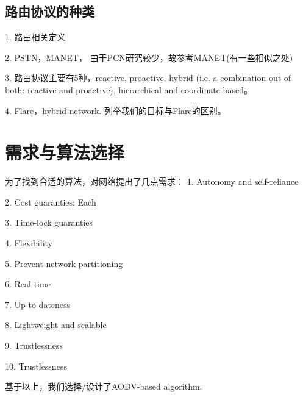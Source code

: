 \documentclass[12pt,a4paper]{article}
\begin{document}
\subsection{路由协议的种类}


1. 路由相关定义

2. PSTN，MANET，
由于PCN研究较少，故参考MANET(有一些相似之处)

3. 路由协议主要有5种，reactive, proactive, hybrid (i.e. a combination out of both: reactive and proactive), hierarchical and coordinate-based。

4. Flare，hybrid network. 列举我们的目标与Flare的区别。

\section{需求与算法选择}
为了找到合适的算法，对网络提出了几点需求：
1. Autonomy and self-reliance

2. Cost guaranties: Each

3. Time-lock guaranties

4. Flexibility

5. Prevent network partitioning

6. Real-time

7. Up-to-dateness

8. Lightweight and scalable

9. Trustlessness

10. Trustlessness

基于以上，我们选择/设计了AODV-based algorithm.

\clearpage



\end{document}

